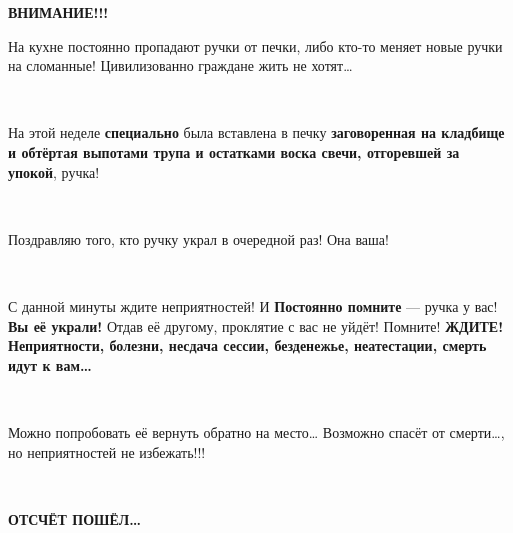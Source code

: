\documentclass[a4paper,12pt,landscape,notitlepage]{article}
\author{Michael Pogoda}
\date{21.05.2010}
\begin{document}
\thispagestyle{empty}
\begin{center}
\Large
\textbf{\Huge ВНИМАНИЕ!!!}

На кухне постоянно пропадают ручки от печки, либо кто-то меняет новые ручки на сломанные!
Цивилизованно граждане жить не хотят\dots

~


На этой неделе \textbf{специально} была вставлена в печку \textbf{заговоренная на кладбище и обтёртая
выпотами трупа и остатками воска свечи, отгоревшей за упокой}, ручка!

~

Поздравляю того, кто ручку украл в очередной раз! Она ваша!

~

С данной минуты ждите неприятностей! И \textbf{Постоянно помните} --- ручка у вас!
\textbf{Вы её украли!}
Отдав её другому, проклятие с вас не уйдёт! Помните!
\textbf{ЖДИТЕ! Неприятности, болезни, несдача сессии, безденежье, неатестации, смерть идут к вам\dots}

~

Можно попробовать её вернуть обратно на место\dots
Возможно спасёт от смерти\dots, но неприятностей не избежать!!!

~

\textbf{\Huge ОТСЧЁТ ПОШЁЛ\dots}
\end{center}
\end{document}
